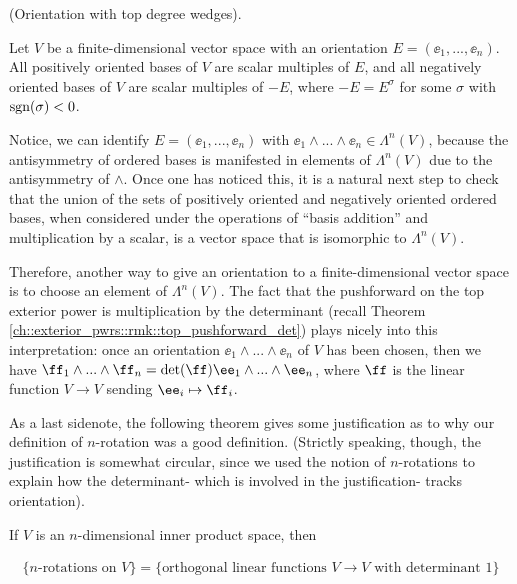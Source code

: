 \begin{theorem}
\label{ch::exterior_pwrs::defn::orientation_with_top_degree_wedges}

    (Orientation with top degree wedges).
    
    Let $V$ be a finite-dimensional vector space with an orientation $E = (\ee_1, ..., \ee_n)$. All positively oriented bases of $V$ are scalar multiples of $E$, and all negatively oriented bases of $V$ are scalar multiples of $-E$, where $-E = E^\sigma$ for some $\sigma$ with $\text{sgn}(\sigma) < 0$.
    
    Notice, we can identify $E = (\ee_1, ..., \ee_n)$ with $\ee_1 \wedge ... \wedge \ee_n \in \Lambda^n(V)$, because the antisymmetry of ordered bases is manifested in elements of $\Lambda^n(V)$ due to the antisymmetry of $\wedge$. Once one has noticed this, it is a natural next step to check that the union of the sets of positively oriented and negatively oriented ordered bases, when considered under the operations of ``basis addition'' and multiplication by a scalar, is a vector space that is isomorphic to $\Lambda^n(V)$.
    
    Therefore, another way to give an orientation to a finite-dimensional vector space is to choose an element of $\Lambda^n(V)$. The fact that the pushforward on the top exterior power is multiplication by the determinant (recall Theorem \ref{ch::exterior_pwrs::rmk::top_pushforward_det}) plays nicely into this interpretation: once an orientation $\ee_1 \wedge ... \wedge \ee_n$ of $V$ has been chosen, then we have $\ff_1 \wedge ... \wedge \ff_n = \det(\ff) \ee_1 \wedge ... \wedge \ee_n$, where $\ff$ is the linear function $V \rightarrow V$ sending $\ee_i \mapsto \ff_i$.
\end{theorem}

As a last sidenote, the following theorem gives some justification as to why our definition of $n$-rotation was a good definition. (Strictly speaking, though, the justification is somewhat circular, since we used the notion of $n$-rotations to explain how the determinant- which is involved in the justification- tracks orientation).

\begin{theorem}
    If $V$ is an $n$-dimensional inner product space, then 
    
    \begin{align*}
        \{\text{$n$-rotations on $V$}\} = \{\text{orthogonal linear functions $V \rightarrow V$ with determinant 1}\}
    \end{align*}
\end{theorem}

